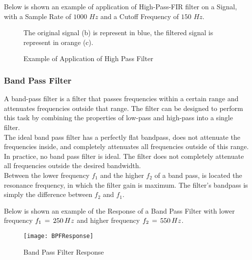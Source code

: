 \documentclass[tesi]{subfiles}
\begin{document}
\noindent Below is shown an example of application of High-Pass-FIR filter on a Signal, with a Sample Rate of $1000$ $Hz$ and a Cutoff Frequency of $150$ $Hz$.


\begin{figure}[H]
\centering	
{}    




The original signal (b) is represent in blue, the filtered signal is represent in orange (c).

 \caption{Example of Application of High Pass Filter}
  \label{fig:Example of Application of Low Pass Filter.}
\end{figure}

\subsubsection{Band Pass Filter} \label{ssc:Band Pass Filter}
A band-pass filter is a filter that passes frequencies within a certain range and attenuates frequencies outside that range. 
The filter can be designed to perform this task by combining the properties of low-pass and high-pass into a single filter.\\
\noindent The ideal band pass filter has a perfectly flat bandpass, does not attenuate the frequencies inside, and completely attenuates all frequencies outside of this range.
In practice, no band pass filter is ideal. The filter does not completely attenuate all frequencies outside the desired bandwidth.\\
\noindent Between the lower frequency $f_{1}$ and the higher $f_{2}$ of a band pass, is located the resonance frequency, in which the filter gain is maximum. 
The filter's bandpass is simply the difference between $f_{2}$ and $f_{1}$. 

\noindent Below is shown an example of the Response of a Band Pass Filter with lower frequency $f_{1} \thinspace = \thinspace 250 \thinspace Hz$ and higher frequency $f_{2} \thinspace = \thinspace 550 \thinspace Hz$. 

\begin{figure}[H]
\centering
\texttt{[image: BPFResponse]} 
 \caption{Band Pass Filter Response}
  \label{fig:Band Pass Filter Response}
\end{figure}
\end{document}
